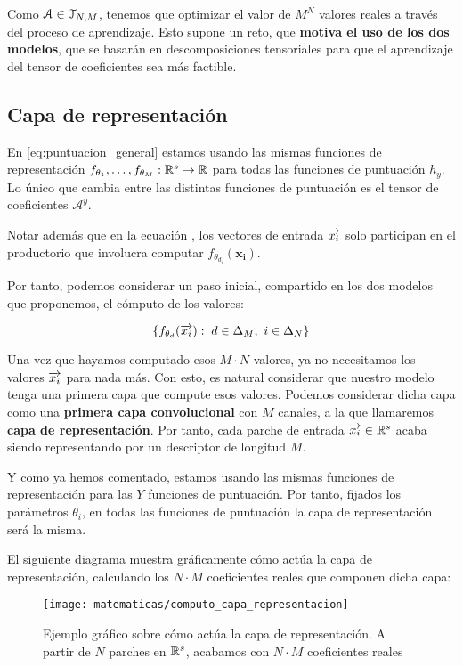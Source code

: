 \begin{observacion}
	Como $\mathcal{A} \in \mathcal{T}_{N, M}$, tenemos que optimizar el valor de $M^N$ valores reales a través del proceso de aprendizaje. Esto supone un reto, que \textbf{motiva el uso de los dos modelos}, que se basarán en descomposiciones tensoriales para que el aprendizaje del tensor de coeficientes sea más factible.
\end{observacion}

\subsection{Capa de representación} \label{subs:capa_de_representacion}

En \eqref{eq:puntuacion_general} estamos usando las mismas funciones de representación $f_{\theta_1}, \ldots, f_{\theta_M}: \mathbb{R}^s \to \mathbb{R}$ para todas las funciones de puntuación $h_y$. Lo único que cambia entre las distintas funciones de puntuación es el tensor de coeficientes $\mathcal{A}^y$.

Notar además que en la ecuación , los vectores de entrada $\overrightarrow{x_i}$ solo participan en el productorio que involucra computar $f_{\theta_{d_i}}(\mathbf{x_i})$.

Por tanto, podemos considerar un paso inicial, compartido en los dos modelos que proponemos, el cómputo de los valores:

$$\{f_{\theta_d}(\overrightarrow{x_i}): \; d \in \Delta_{M},\ i \in \Delta_{N} \}$$

Una vez que hayamos computado esos $M \cdot N$ valores, ya no necesitamos los valores $\overrightarrow{x_i}$ para nada más. Con esto, es natural considerar que nuestro modelo tenga una primera capa que compute esos valores. Podemos considerar dicha capa como una \textbf{primera capa convolucional} con $M$ canales, a la que llamaremos \textbf{capa de representación}. Por tanto, cada parche de entrada $\overrightarrow{x_i} \in \mathbb{R}^s$ acaba siendo representando por un descriptor de longitud $M$.

Y como ya hemos comentado, estamos usando las mismas funciones de representación para las $Y$ funciones de puntuación. Por tanto, fijados los parámetros $\theta_i$, en todas las funciones de puntuación la capa de representación será la misma.

El siguiente diagrama muestra gráficamente cómo actúa la capa de representación, calculando los $N \cdot M$ coeficientes reales que componen dicha capa:

\begin{figure}[H]
	\centering
	\texttt{[image: matematicas/computo\_capa\_representacion]}
	\caption{Ejemplo gráfico sobre cómo actúa la capa de representación. A partir de $N$ parches en $\mathbb{R}^s$, acabamos con $N \cdot M$ coeficientes reales}
\end{figure}


